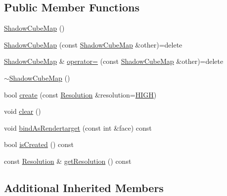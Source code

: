 \subsection*{Public Member Functions}
\begin{DoxyCompactItemize}
\item 
\hyperlink{classburn_1_1_shadow_cube_map_a599b548269fabfd0ee97e1d5ce9f38a9}{Shadow\-Cube\-Map} ()
\item 
\hyperlink{classburn_1_1_shadow_cube_map_a3d9ddc7204cdc28972e34607c323858a}{Shadow\-Cube\-Map} (const \hyperlink{classburn_1_1_shadow_cube_map}{Shadow\-Cube\-Map} \&other)=delete
\item 
\hyperlink{classburn_1_1_shadow_cube_map}{Shadow\-Cube\-Map} \& \hyperlink{classburn_1_1_shadow_cube_map_ad6121442fd4c9e91ec80b1c1f49241ef}{operator=} (const \hyperlink{classburn_1_1_shadow_cube_map}{Shadow\-Cube\-Map} \&other)=delete
\item 
\hyperlink{classburn_1_1_shadow_cube_map_ae42dcafba18ff6617621fec719d9bd7f}{$\sim$\-Shadow\-Cube\-Map} ()
\item 
bool \hyperlink{classburn_1_1_shadow_cube_map_adfed32062083f0a6ee604afd737141ed}{create} (const \hyperlink{classburn_1_1_shadow_cube_map_a199f4c817b2cadb4f3b93c270c4f209e}{Resolution} \&resolution=\hyperlink{classburn_1_1_shadow_cube_map_a199f4c817b2cadb4f3b93c270c4f209eadec66121357f641252b33af54af06eab}{H\-I\-G\-H})
\item 
void \hyperlink{classburn_1_1_shadow_cube_map_a20303d8a205cf66cb5b9e979fb868c88}{clear} ()
\item 
void \hyperlink{classburn_1_1_shadow_cube_map_a410af6be57e69747cbdc7c4fbe05873b}{bind\-As\-Rendertarget} (const int \&face) const 
\item 
bool \hyperlink{classburn_1_1_shadow_cube_map_a284df2f4e4f5440e5290208aa59a0c68}{is\-Created} () const 
\item 
const \hyperlink{classburn_1_1_shadow_cube_map_a199f4c817b2cadb4f3b93c270c4f209e}{Resolution} \& \hyperlink{classburn_1_1_shadow_cube_map_abe6912373648fbde0ee90d894ec92db1}{get\-Resolution} () const 
\end{DoxyCompactItemize}
\subsection*{Additional Inherited Members}


